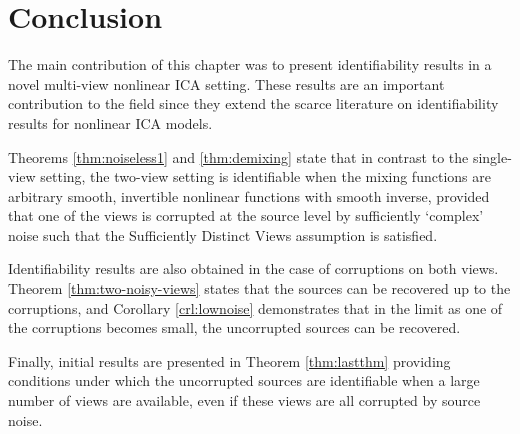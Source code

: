 \section{Conclusion}
\label{sec:on_suffistv}

The main contribution of this chapter was to present identifiability results in a novel multi-view nonlinear ICA setting.
These results are an important contribution to the field since they extend the scarce literature on identifiability results for nonlinear ICA models.


Theorems \ref{thm:noiseless1} and \ref{thm:demixing} state that in contrast to the single-view setting, the two-view setting is identifiable when the mixing functions are arbitrary smooth, invertible nonlinear functions with smooth inverse, provided that one of the views is corrupted at the source level by sufficiently `complex' noise such that the Sufficiently Distinct Views assumption is satisfied. 

Identifiability results are also obtained in the case of corruptions on both views. Theorem \ref{thm:two-noisy-views} states that the sources can be recovered up to the corruptions, and Corollary \ref{crl:lownoise} demonstrates that in the limit as one of the corruptions becomes small, the uncorrupted sources can be recovered.

Finally, initial results are presented in Theorem \ref{thm:lastthm} providing conditions under which the uncorrupted sources are identifiable when a large number of views are available, even if these views are all corrupted by source noise.



